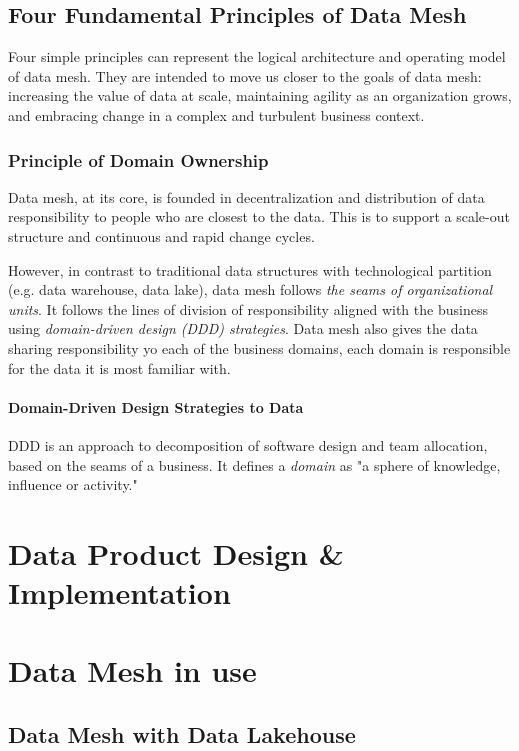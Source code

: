 \documentclass[12pt, a4paper]{book}
\begin{document}
\section{Four Fundamental Principles of Data Mesh}\label{4principles}
Four simple principles can represent the logical architecture and operating model of data mesh. They are intended to move us closer to the goals of data mesh: increasing the value of data at scale, maintaining agility as an organization grows, and embracing change in a complex and turbulent business context.

\subsection{Principle of Domain Ownership}
Data mesh, at its core, is founded in decentralization and distribution of data responsibility to people who are closest to the data. This is to support a scale-out structure and continuous and rapid change cycles.

However, in contrast to traditional data structures with technological partition (e.g. data warehouse, data lake), data mesh follows \textit{the seams of organizational units}. It follows the lines of division of responsibility aligned with the business using \textit{domain-driven design (DDD) strategies}. Data mesh also gives the data sharing responsibility yo each of the business domains, each domain is responsible for the data it is most familiar with.

\subsubsection*{Domain-Driven Design Strategies to Data}
DDD is an approach to decomposition of software design and team allocation, based on the seams of a business. It defines a \textit{domain} as "a sphere of knowledge, influence or activity."



\chapter{Data Product Design \& Implementation}

\chapter{Data Mesh in use}
\section{Data Mesh with Data Lakehouse}
\end{document}
